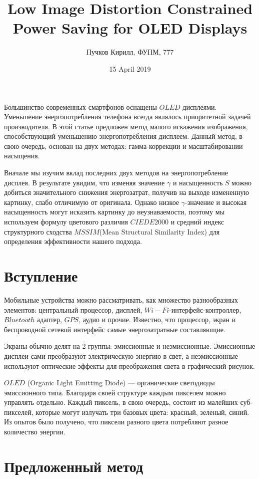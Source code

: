 \documentclass[a4paper, 12pt]{article}
\title{Low Image Distortion Constrained Power Saving for OLED  Displays}
\author{Пучков Кирилл, ФУПМ, 777}
\date{15 April 2019}
\begin{document}
\maketitle

	Большинство современных смартфонов оснащены $OLED$-дисплеями. Уменьшение энергопотребления телефона всегда являлось приоритетной задачей производителя. В этой статье предложен метод малого искажения изображения, способствующий уменьшению энергопотребления дисплеем. Данный метод, в свою очередь, основан на двух методах: гамма-коррекции и масштабировании насыщения.
	
	Вначале мы изучим вклад последних двух методов на энергопотребление дисплея. В результате увидим, что изменяя значение $\gamma$ и насыщенность $S$ можно добиться значительного снижения энергозатрат, получив на выходе измененную картинку, слабо отличимую от оригинала. Однако низкое $\gamma$-значение и высокая насыщенность могут исказить картинку до неузнаваемости, поэтому мы используем формулу цветового различия $CIEDE2000$ и средний индекс структурного сходства $MSSIM$(Mean Structural Similarity Index) для определения эффективности нашего подхода.
	
\section*{Вступление}

	Мобильные устройства можно рассматривать, как множество разнообразных элементов: центральный процессор, дисплей, $Wi-Fi$-интерфейс-контроллер, $Bluetooth$ адаптер, $GPS$, аудио и прочие. Известно, что процессор, экран и беспроводной сетевой интерфейс  самые энергозатратные составляющие.
	
	Экраны обычно делят на 2 группы: эмиссионные и неэмиссионные. Эмиссионные дисплеи сами преобразуют электрическую энергию в свет, а неэмиссионные используют оптические эффекты для преображения света в графический рисунок.
    
    $OLED$ (Organic Light Emitting Diode) — органические светодиоды эмиссионного типа. Благодаря своей структуре каждым пикселем можно управлять отдельно. Каждый пиксель, в свою очередь, состоит из малейших суб-пикселей, которые могут излучать три базовых цвета: красный, зеленый, синий. Из опытов было получено, что пиксели разного цвета потребляют разное количество энергии.
    
\section*{Предложенный метод}
\end{document}
